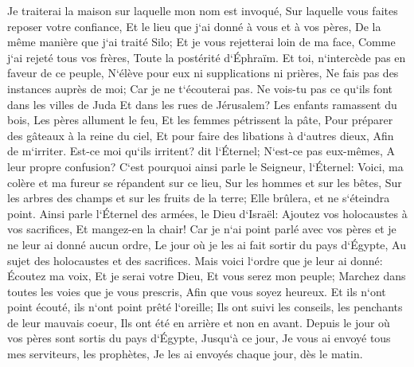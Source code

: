 \verse Je traiterai la maison sur laquelle mon nom est invoqué, Sur laquelle vous faites reposer votre confiance, Et le lieu que j`ai donné à vous et à vos pères, De la même manière que j`ai traité Silo; 
\verse Et je vous rejetterai loin de ma face, Comme j`ai rejeté tous vos frères, Toute la postérité d`Éphraïm. 
\verse Et toi, n`intercède pas en faveur de ce peuple, N`élève pour eux ni supplications ni prières, Ne fais pas des instances auprès de moi; Car je ne t`écouterai pas. 
\verse Ne vois-tu pas ce qu`ils font dans les villes de Juda Et dans les rues de Jérusalem? 
\verse Les enfants ramassent du bois, Les pères allument le feu, Et les femmes pétrissent la pâte, Pour préparer des gâteaux à la reine du ciel, Et pour faire des libations à d`autres dieux, Afin de m`irriter. 
\verse Est-ce moi qu`ils irritent? dit l`Éternel; N`est-ce pas eux-mêmes, A leur propre confusion? 
\verse C`est pourquoi ainsi parle le Seigneur, l`Éternel: Voici, ma colère et ma fureur se répandent sur ce lieu, Sur les hommes et sur les bêtes, Sur les arbres des champs et sur les fruits de la terre; Elle brûlera, et ne s`éteindra point. 
\verse Ainsi parle l`Éternel des armées, le Dieu d`Israël: Ajoutez vos holocaustes à vos sacrifices, Et mangez-en la chair! 
\verse Car je n`ai point parlé avec vos pères et je ne leur ai donné aucun ordre, Le jour où je les ai fait sortir du pays d`Égypte, Au sujet des holocaustes et des sacrifices. 
\verse Mais voici l`ordre que je leur ai donné: Écoutez ma voix, Et je serai votre Dieu, Et vous serez mon peuple; Marchez dans toutes les voies que je vous prescris, Afin que vous soyez heureux. 
\verse Et ils n`ont point écouté, ils n`ont point prêté l`oreille; Ils ont suivi les conseils, les penchants de leur mauvais coeur, Ils ont été en arrière et non en avant. 
\verse Depuis le jour où vos pères sont sortis du pays d`Égypte, Jusqu`à ce jour, Je vous ai envoyé tous mes serviteurs, les prophètes, Je les ai envoyés chaque jour, dès le matin. 
